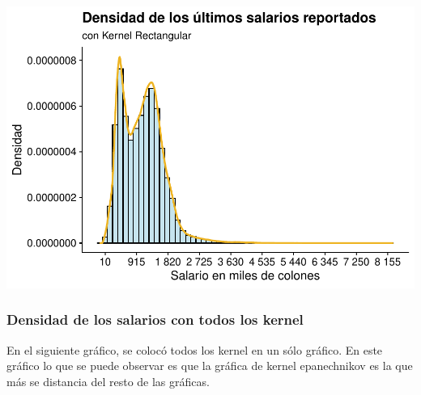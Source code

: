 \documentclass[
]{article}
\newenvironment{Shaded}{\begin{snugshade}}{\end{snugshade}}
\newcommand{\AttributeTok}[1]{\textcolor[rgb]{0.13,0.29,0.53}{#1}}
\newcommand{\DecValTok}[1]{\textcolor[rgb]{0.00,0.00,0.81}{#1}}
\newcommand{\FunctionTok}[1]{\textcolor[rgb]{0.13,0.29,0.53}{\textbf{#1}}}
\newcommand{\NormalTok}[1]{#1}
\newcommand{\OtherTok}[1]{\textcolor[rgb]{0.56,0.35,0.01}{#1}}
\newcommand{\SpecialCharTok}[1]{\textcolor[rgb]{0.81,0.36,0.00}{\textbf{#1}}}
\newcommand{\StringTok}[1]{\textcolor[rgb]{0.31,0.60,0.02}{#1}}
\begin{document}
\begin{Shaded}
\end{Shaded}

\includegraphics{Tarea1_files/figure-latex/unnamed-chunk-27-1.pdf}

\hypertarget{densidad-de-los-salarios-con-todos-los-kernel}{%
\subsubsection{Densidad de los salarios con todos los
kernel}\label{densidad-de-los-salarios-con-todos-los-kernel}}

En el siguiente gráfico, se colocó todos los kernel en un sólo gráfico.
En este gráfico lo que se puede observar es que la gráfica de kernel
epanechnikov es la que más se distancia del resto de las gráficas.
\end{document}
